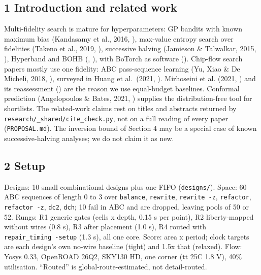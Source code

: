 \documentclass[conference]{IEEEtran}
\begin{document}
\hypertarget{introduction-and-related-work}{%
\subsection{1 Introduction and related
work}\label{introduction-and-related-work}}

Multi-fidelity search is mature for hyperparameters: GP bandits with
known maximum bias (Kandasamy et al., 2016, \cite{kandasamy2016mfgp}), max-value
entropy search over fidelities (Takeno et al., 2019, \cite{takeno2019mfmes}),
successive halving (Jamieson \& Talwalkar, 2015, \cite{jamieson2015sh}),
Hyperband and BOHB (\cite{li2017hyperband}, \cite{falkner2018bohb}), with BoTorch as
software (\cite{balandat2020botorch}). Chip-flow search papers mostly use one
fidelity: ABC pass-sequence learning (Yu, Xiao \& De Micheli, 2018,
\cite{yu2018synthesis}), surveyed in Huang et al.~(2021, \cite{huang2021mleda}).
Mirhoseini et al. (2021, \cite{mirhoseini2021graph}) and its
reassessment (\cite{updated2023rl}) are the reason we use equal-budget
baselines. Conformal prediction (Angelopoulos \& Bates, 2021,
\cite{angelopoulos2021conformal}) supplies the distribution-free tool for shortlists.
The related-work claims rest on titles and abstracts returned by
\texttt{research/\allowbreak{}\_\allowbreak{}shared/\allowbreak{}cite\_\allowbreak{}check.py}, not on a full reading of
every paper (\texttt{PROPOSAL.md}). The inversion bound of Section 4 may
be a special case of known successive-halving analyses; we do not claim
it as new.

\hypertarget{setup}{%
\subsection{2 Setup}\label{setup}}

Designs: 10 small combinational designs plus one FIFO
(\texttt{designs/\allowbreak{}}). Space: 60 ABC sequences of length 0 to 3 over
\texttt{balance}, \texttt{rewrite}, \texttt{rewrite\ -z},
\texttt{refactor}, \texttt{refactor\ -z}, \texttt{dc2}, \texttt{dch}; 10
fail in ABC and are dropped, leaving pools of 50 or 52. Rungs: R1
generic gates (cells x depth, 0.15 s per point), R2 liberty-mapped
without wires (0.8 s), R3 after placement (1.0 s), R4 routed with
\texttt{repair\_\allowbreak{}timing\ -setup} (1.3 s), all one core. Score: area x
period; clock targets are each design's own no-wire baseline (tight) and
1.5x that (relaxed). Flow: Yosys 0.33, OpenROAD 26Q2, SKY130 HD, one
corner (tt 25C 1.8 V), 40\% utilisation. ``Routed'' is
global-route-estimated, not detail-routed.
\end{document}
